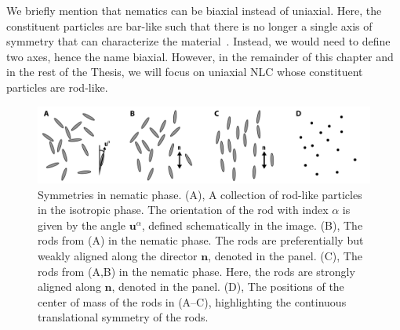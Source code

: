 We briefly mention that nematics can be biaxial instead of uniaxial.
Here, the constituent particles are bar-like such that there is no longer a single axis of symmetry that can characterize the material~\cite{RN33,RN175}.
Instead, we would need to define two axes, hence the name biaxial.
However, in the remainder of this chapter and in the rest of the Thesis, we will focus on uniaxial NLC whose constituent particles are rod-like.

\begin{figure}[h]
  \centering
  \includegraphics{figures/C2/Ch2-Figs_NematicSym.png}
  \caption{ Symmetries in nematic phase. (A), A collection of rod-like particles in the isotropic phase.
  The orientation of the rod with index $\alpha$ is given by the angle $\mathbf{u}^{\alpha}$, defined schematically in the image.
  (B), The rods from (A) in the nematic phase.
  The rods are preferentially but weakly aligned along the director $\mathbf{n}$, denoted in the panel.
  (C), The rods from (A,B) in the nematic phase. Here, the rods are strongly aligned along $\mathbf{n}$, denoted in the panel.
  (D), The positions of the center of mass of the rods in (A--C), highlighting the continuous translational symmetry of the rods.}\label{f:2-NematicSym}
\end{figure}

